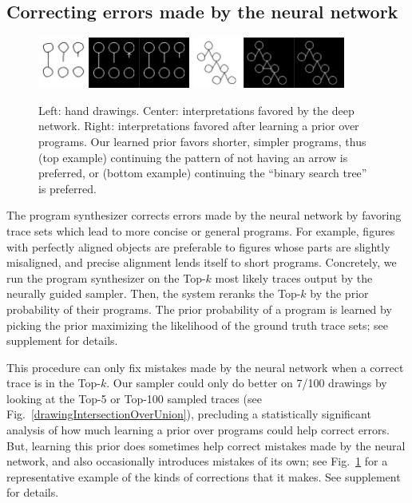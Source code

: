 \documentclass{article}
\theoremstyle{definition}
\begin{document}
\subsection{Correcting errors made by the neural network}\label{synthesizerHelpsParsing}
\begin{figure}\vspace{-0.5cm}
  \includegraphics[width = 5cm]{figures/programSuccess7.png}
  \includegraphics[width = 5cm]{figures/programSuccess16.png}
  \caption{Left: hand drawings. Center: interpretations favored by the deep network. Right: interpretations favored after learning a prior over programs. Our learned prior favors shorter, simpler programs, thus (top example) continuing the pattern of not having an arrow is preferred, or (bottom example) continuing the ``binary search tree'' is preferred.}\label{exampleOfProgramCorrectingMistake}
\vspace{0.5cm}  \end{figure}
The program synthesizer corrects errors made by the neural network by favoring trace sets which lead to more
concise or general programs.  For example, figures with perfectly aligned objects are preferable to figures whose parts are slightly misaligned, and precise alignment lends itself to short
programs.
Concretely,
we run the program synthesizer on the
Top-$k$  most likely traces output by the neurally guided sampler.
Then, the system
reranks the Top-$k$  by  the prior probability of their programs.
The prior probability of a program is learned by picking the prior maximizing
the likelihood of the ground truth trace sets;
see supplement for details.

This procedure can only fix
mistakes made by the neural network when
a correct trace is in the Top-$k$.
Our sampler could only do better on
7/100 drawings by looking at the Top-5 or Top-100 sampled traces
(see Fig.~\ref{drawingIntersectionOverUnion}),
precluding a statistically significant analysis of how much
learning a prior over programs could help correct errors.
But,
learning this prior does sometimes
help correct mistakes made by the neural network, and also
occasionally introduces mistakes of its own; see
Fig.~\ref{exampleOfProgramCorrectingMistake} for a representative
example of the kinds of corrections that it makes.
See supplement for details.
\end{document}
